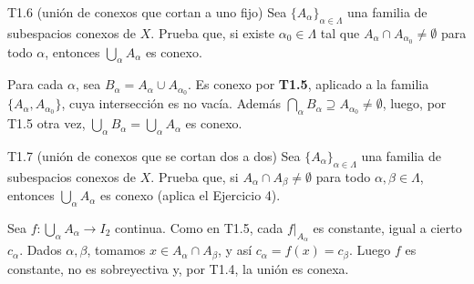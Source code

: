 \begin{ejercicio}{T1.6 (unión de conexos que cortan a uno fijo)}
Sea $\{A_\alpha\}_{\alpha \in \Lambda}$ una familia de subespacios conexos de $X$. Prueba que, si existe $\alpha_0 \in \Lambda$ tal que $A_\alpha \cap A_{\alpha_0} \neq \emptyset$ para todo $\alpha$, entonces $\bigcup_\alpha A_\alpha$ es conexo.

\sol \fuentepropia

Para cada $\alpha$, sea $B_\alpha = A_\alpha \cup A_{\alpha_0}$. Es conexo por \textbf{T1.5}, aplicado a la familia $\{A_\alpha, A_{\alpha_0}\}$, cuya intersección es no vacía. Además $\bigcap_\alpha B_\alpha \supseteq A_{\alpha_0} \neq \emptyset$, luego, por T1.5 otra vez, $\bigcup_\alpha B_\alpha = \bigcup_\alpha A_\alpha$ es conexo.
\end{ejercicio}

\begin{ejercicio}{T1.7 (unión de conexos que se cortan dos a dos)}
Sea $\{A_\alpha\}_{\alpha \in \Lambda}$ una familia de subespacios conexos de $X$. Prueba que, si $A_\alpha \cap A_\beta \neq \emptyset$ para todo $\alpha, \beta \in \Lambda$, entonces $\bigcup_\alpha A_\alpha$ es conexo (aplica el Ejercicio 4).

\sol \fuentepropia

Sea $f \colon \bigcup_\alpha A_\alpha \to I_2$ continua. Como en T1.5, cada $f|_{A_\alpha}$ es constante, igual a cierto $c_\alpha$. Dados $\alpha, \beta$, tomamos $x \in A_\alpha \cap A_\beta$, y así $c_\alpha = f(x) = c_\beta$. Luego $f$ es constante, no es sobreyectiva y, por T1.4, la unión es conexa.
\end{ejercicio}

